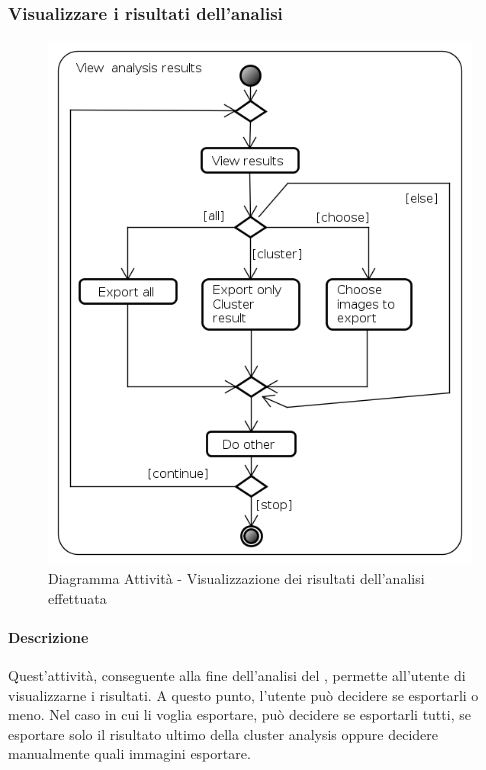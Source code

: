 \subsubsection{Visualizzare i risultati dell'analisi}
\label{seeAnalysis}
\begin{figure}[!h]
\centering
\includegraphics[width=0.6\linewidth]{./Content/Immagini/See_Analysis_Result}
\caption{Diagramma Attività - Visualizzazione dei risultati dell'analisi effettuata}
\label{showAnalysis}
\end{figure}
\paragraph{Descrizione\\}
Quest'attività, conseguente alla fine dell'analisi del \dataset{}, permette all'utente di visualizzarne i risultati. A questo punto, l'utente può decidere se esportarli o meno. Nel caso in cui li voglia esportare, può decidere se esportarli tutti, se esportare solo il risultato ultimo della cluster analysis\glossario{} oppure decidere manualmente quali immagini esportare.
\pagebreak

